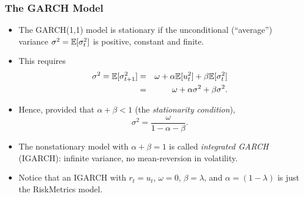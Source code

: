\begin{frame}%

\frametitle{The GARCH Model}

\begin{itemize}
\item The GARCH(1,1) model is stationary if the unconditional (``average'') variance $%
\sigma ^{2}=\E[\sigma _{t}^{2}]$ is positive, constant and
finite.

\item This requires%
\begin{eqnarray*}
\sigma ^{2}={\mathbb E}[\sigma _{t+1}^{2}] &=&\omega +\alpha {\mathbb E}[u_{t}^{2}]+\beta
{\mathbb E}[\sigma _{t}^{2}] \\
&=&\omega +\alpha \sigma ^{2}+\beta \sigma ^{2}.
\end{eqnarray*}

\item Hence, provided that $\alpha +\beta <1$ (the \emph{\color{red}%
stationarity condition}),%
\begin{equation*}
\sigma ^{2}=\frac{\omega }{1-\alpha -\beta }.
\end{equation*}

\item The nonstationary model with $\alpha +\beta =1$ is called \emph{%
\color{red}integrated GARCH} (IGARCH): infinite variance, no mean-reversion
in volatility.

\item Notice that an IGARCH with $r_{t}=u_{t}$, $\omega =0$, $\beta=\lambda$, and $\alpha=(1-\lambda)$ is just the RiskMetrics model.
\end{itemize}

\end{frame}%

